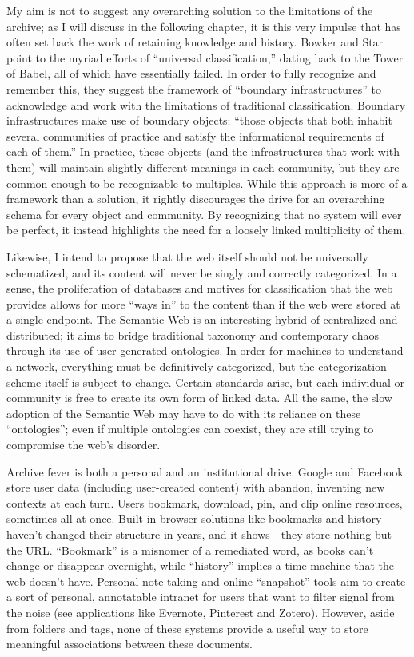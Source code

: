 My aim is not to suggest any overarching solution to the limitations of the archive; as I will discuss in the following chapter, it is this very impulse that has often set back the work of retaining knowledge and history. Bowker and Star point to the myriad efforts of ``universal classification,'' dating back to the Tower of Babel, all of which have essentially failed. In order to fully recognize and remember this, they suggest the framework of ``boundary infrastructures'' to acknowledge and work with the limitations of traditional classification. Boundary infrastructures make use of boundary objects: ``those objects that both inhabit several communities of practice and satisfy the informational requirements of each of them.''  In practice, these objects (and the infrastructures that work with them) will maintain slightly different meanings in each community, but they are common enough to be recognizable to multiples. While this approach is more of a framework than a solution, it rightly discourages the drive for an overarching schema for every object and community. By recognizing that no system will ever be perfect, it instead highlights the need for a loosely linked multiplicity of them.

Likewise, I intend to propose that the web itself should not be universally schematized, and its content will never be singly and correctly categorized. In a sense, the proliferation of databases and motives for classification that the web provides allows for more ``ways in'' to the content than if the web were stored at a single endpoint. The Semantic Web is an interesting hybrid of centralized and distributed; it aims to bridge traditional taxonomy and contemporary chaos through its use of user-generated ontologies. In order for machines to understand a network, everything must be definitively categorized, but the categorization scheme itself is subject to change. Certain standards arise, but each individual or community is free to create its own form of linked data. All the same, the slow adoption of the Semantic Web may have to do with its reliance on these ``ontologies''; even if multiple ontologies can coexist, they are still trying to compromise the web's disorder.

Archive fever is both a personal and an institutional drive. Google and Facebook store user data (including user-created content) with abandon, inventing new contexts at each turn. Users bookmark, download, pin, and clip online resources, sometimes all at once. Built-in browser solutions like bookmarks and history haven't changed their structure in years, and it shows---they store nothing but the URL. ``Bookmark'' is a misnomer of a remediated word, as books can't change or disappear overnight, while ``history'' implies a time machine that the web doesn't have. Personal note-taking and online ``snapshot'' tools aim to create a sort of personal, annotatable intranet for users that want to filter signal from the noise (see applications like Evernote, Pinterest and Zotero). However, aside from folders and tags, none of these systems provide a useful way to store meaningful associations between these documents.

